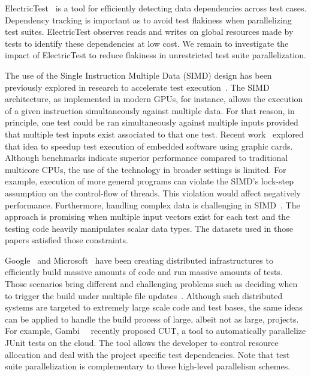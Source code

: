 \documentclass[10pt,journal,compsoc]{IEEEtran}
\begin{document}
ElectricTest~\cite{bell-etal-esecfse2015} is a tool for efficiently
detecting data dependencies across test cases.  Dependency tracking is
important as to avoid test flakiness when parallelizing test
suites. ElectricTest observes reads and writes on global resources
made by tests to identify these dependencies at low cost. We remain to
investigate the impact of ElectricTest to reduce flakiness in
unrestricted test suite parallelization.

The use of the Single Instruction Multiple Data (SIMD) design has been
previously explored in research to accelerate test
execution~\cite{damorim-etal-issta2007,damorim-etal-tse2008,kim-etal-issre2012,nguyen-etal-icse2014,rajan-etal-ase2014,sen-etal-fse2015,yaneva-etal-issta2017}. The
SIMD architecture, as implemented in modern GPUs, for instance, allows
the execution of a given instruction simultaneously against multiple
data.  For that reason, in principle, one test could be ran
simultaneously against multiple inputs provided that multiple test
inputs exist associated to that one test.  Recent
work~\cite{rajan-etal-ase2014,yaneva-etal-issta2017} explored that
idea to speedup test execution of embedded software using graphic
cards. Although benchmarks indicate superior performance compared to
traditional multicore CPUs, the use of the technology in broader
settings is limited. For example, execution of more general programs
can violate the SIMD's lock-step assumption on the control-flow of
threads.  This violation would affect negatively performance.
Furthermore, handling complex data is challenging in
SIMD~\cite{damorim-etal-issta2007,damorim-etal-tse2008}.  The approach
is promising when multiple input vectors exist for each test and the
testing code heavily manipulates scalar data types.  The datasets used
in those papers satisfied those constraints.

Google~\cite{google-tap,google-ci} and
Microsoft~\cite{prasad-shulte-ieee-microsoft-ci} have been creating
distributed infrastructures to efficiently build massive amounts of
code and run massive amounts of tests.  Those scenarios bring
different and challenging problems such as deciding when to trigger
the build under multiple file
updates~\cite{memon-etal-icse17}. Although such distributed systems
are targeted to extremely large scale code and test bases, the same
ideas can be applied to handle the build process of large, albeit not
as large, projects.  For example,
Gambi~\etal{}~\cite{gambi-etal-issta2017} recently proposed CUT, a
tool to automatically parallelize JUnit tests on the cloud. The tool allows
the developer to control resource allocation and deal with the project
specific test dependencies.  Note that test suite parallelization is
complementary to these high-level parallelism schemes.
\end{document}
